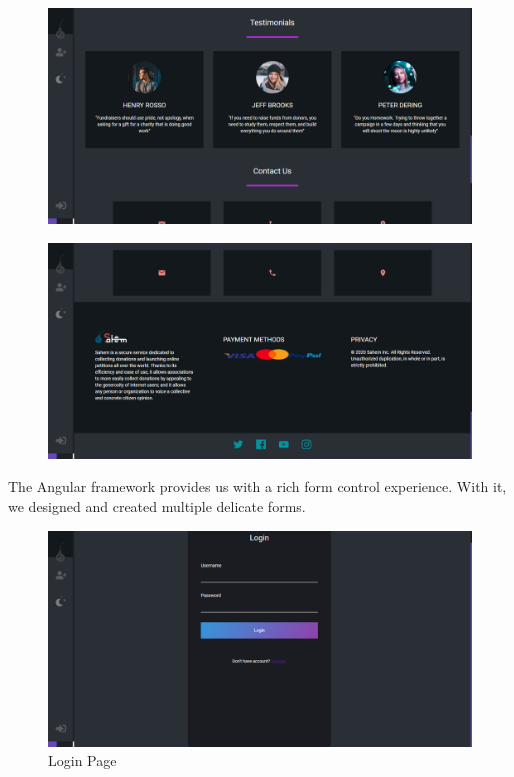  \begin{figure}[H]
      \centering
      \includegraphics[scale=0.45]{assets/screen-main-test.png}
\end{figure}
\begin{figure}[H]
      \centering
      \includegraphics[scale=0.45]{assets/screen-main-foot.png}
\end{figure}






The Angular framework provides us with a rich form control experience. With it, we designed and created multiple delicate forms. 
\begin{figure}[H]
      \centering
      \includegraphics[scale=0.45]{assets/screen-login.png}
      \caption{Login Page}
      \label{fig:login page}
\end{figure}


